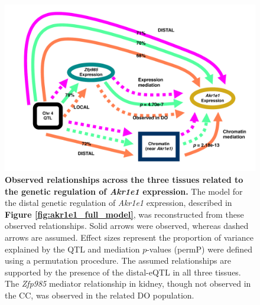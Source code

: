 \documentclass[9pt,twocolumn,twoside]{gsajnl}
\begin{document}
\begin{figure}[hp]
\renewcommand{\familydefault}{\sfdefault}\normalfont
\centering
\includegraphics[width=\textwidth, trim={0in 0in 0in 0in}, clip]{figs/akr1e1_observed_relationships.pdf}
\caption{\textbf{Observed relationships across the three tissues related to the genetic regulation of \textit{Akr1e1} expression.} The model for the distal genetic regulation of \textit{Akr1e1} expression, described in \textbf{Figure \ref{fig:akr1e1_full_model}}, was reconstructed from these observed relationships. Solid arrows were observed, whereas dashed arrows are assumed. Effect sizes represent the proportion of variance explained by the QTL and mediation $p$-values (permP) were defined using a permutation procedure. The assumed relationships are supported by the presence of the distal-eQTL in all three tissues. The \textit{Zfp985} mediator relationship in kidney, though not observed in the CC, was observed in the related DO population.
\label{fig:akr1e1_relationships}}
\end{figure}
\end{document}
